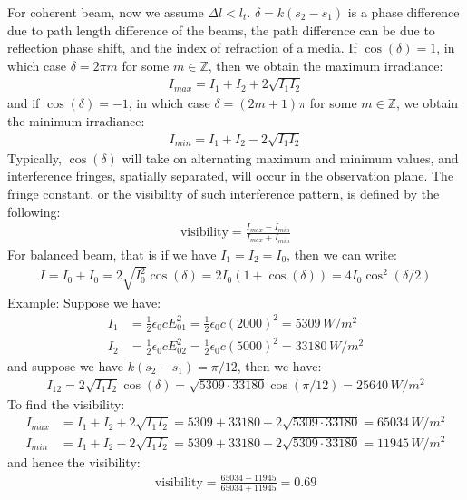 \documentclass[11pt]{book}
\theoremstyle{break}
\theoremstyle{break}
\newcommand{\Z}{\mathbb{Z}}
\newcommand{\example}{\color{green}Example: \color{black}}
\begin{document}
For coherent beam, now we assume $\Delta l < l_t$. $\delta = k(s_2 - s_1)$ is a phase difference due to path length difference of the beams, the path difference can be due to reflection phase shift, and the index of refraction of a media. If $\cos(\delta) = 1$, in which case $\delta = 2\pi m$ for some $m\in \Z$, then we obtain the maximum irradiance:
\begin{align*}
I_{max} = I_1 + I_2 + 2\sqrt{I_1 I_2}
\end{align*}
and if $\cos(\delta) = -1$, in which case $\delta = (2m+1)\pi $ for some $m\in \Z$,  we obtain the minimum irradiance:
\begin{align*}
I_{min} = I_1 + I_2 - 2\sqrt{I_1 I_2}
\end{align*}
Typically, $\cos(\delta)$ will take on alternating maximum and minimum values, and interference fringes, spatially separated, will occur in the observation plane. The fringe constant, or the visibility of such interference pattern, is defined by the following:
\begin{align*}
\text{visibility} = \frac{I_{max} - I_{min}}{I_{max} + I_{min}}
\end{align*}
For balanced beam, that is if we have $I_1 = I_2 = I_0$, then we can write:
\begin{align}
I = I_0 + I_0 = 2\sqrt{I_0^2}\cos(\delta) = 2I_0(1+ \cos(\delta)) = 4I_0 \cos^2(\delta /2)
\end{align}
\example Suppose we have:
\begin{align*}
I_1 &= \frac{1}{2}\epsilon_0 c E_{01}^2 = \frac{1}{2}\epsilon_0 c\left( 2000\right)^2 = 5309\, W/m^2\\
I_2 &= \frac{1}{2}\epsilon_0 c E_{02}^2 = \frac{1}{2}\epsilon_0 c(5000)^2 = 33180 \, W/m^2
\end{align*}
and suppose we have $k(s_2 - s_1) = \pi/12$, then we have:
\begin{align*}
I_{12} =2\sqrt{I_1 I_2}\cos(\delta) = \sqrt{5309 \cdot 33180}\cos(\pi/12) = 25640\, W/m^2
\end{align*}
To find the visibility:
\begin{align*}
I_{max} &= I_1 + I_2 + 2\sqrt{I_1I_2} = 5309 + 33180 + 2\sqrt{5309 \cdot 33180} = 65034\, W/m^2\\
I_{min} &=  I_1 + I_2 - 2\sqrt{I_1I_2} = 5309 + 33180 - 2\sqrt{5309 \cdot 33180} =11945\, W/m^2
\end{align*}
and hence the visibility:
\begin{align*}
\text{visibility} = \frac{65034 - 11945}{65034 + 11945} = 0.69
\end{align*}
\end{document}
